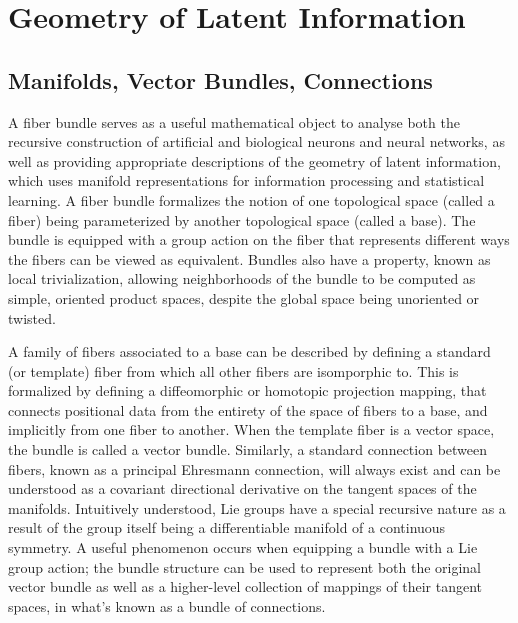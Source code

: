 \documentclass{article}
\begin{document}


\section{Geometry of Latent Information}
\subsection{Manifolds, Vector Bundles, Connections}
    A fiber bundle serves as a useful mathematical object to analyse both the recursive construction of artificial and biological neurons and neural networks, as well as providing appropriate descriptions of the geometry of latent information, which uses manifold representations for information processing and statistical learning.
    A fiber bundle formalizes the notion of one topological space (called a fiber) being parameterized by another topological space (called a base). The bundle is equipped with a group action on the fiber that represents different ways the fibers can be viewed as equivalent. Bundles also have a property, known as local trivialization, allowing neighborhoods of the bundle to be computed as simple, oriented product spaces, despite the global space  being unoriented or twisted.
    
    A family of fibers associated to a base can be described by defining a standard (or template) fiber from which all other fibers are isomporphic to. This is formalized by defining a diffeomorphic or homotopic projection mapping, that connects positional data from the entirety of the space of fibers to a base, and implicitly from one fiber to another. When the template fiber is a vector space, the bundle is called a vector bundle. Similarly, a standard connection between fibers, known as a principal Ehresmann connection, will always exist and can be understood as a covariant directional derivative on the tangent spaces of the manifolds. Intuitively understood, Lie groups have a special recursive nature as a result of the group itself being a differentiable manifold of a continuous symmetry. A useful phenomenon occurs when equipping a bundle with a Lie group action; the bundle structure can be used to represent both the original vector bundle as well as a higher-level collection of mappings of their tangent spaces, in what's known as a bundle of connections. 
    
\end{document}
